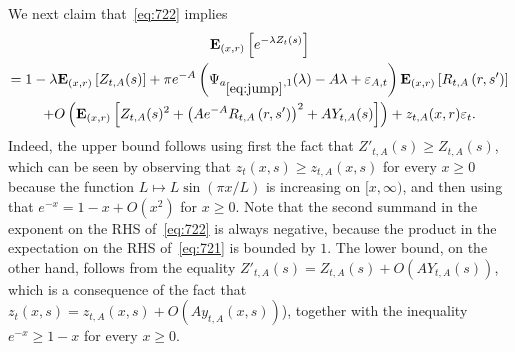 \documentclass[10pt]{amsart}
\theoremstyle{definition}\newtheorem{defi}[theo]{Definition}\newtheorem{rema}[theo]{Remark}\newtheorem{exam}[theo]{Example}\newtheorem{exem}[theo]{Example}\newtheorem{nota}[theo]{Notation}
\newcommand*\eps{\varepsilon}
\newcommand*\E{\mathbf{E}}
\newcommand{\1} {\mathds{1}}
\begin{document}
We next claim that~\eqref{eq:722} implies
\begin{multline}\label{eq:723}
\E_{(x,r)}\left[e^{-\lambda Z_t(s)}\right]\\
= 1-\lambda \E_{(x,r)}\left[Z_{t,A}(s)\right] + \pi e^{-A}\left(\Psi_{a_{\eqref{eq:jump}},1}(\lambda) - A\lambda + \eps_{A,t}\right)\E_{(x,r)}\left[R_{t,A}\left(r,s'\right)\right]\\
+ O\left(\E_{(x,r)}\left[Z_{t,A}(s)^2 + \left(Ae^{-A}R_{t,A}\left(r,s'\right)\right)^2 + AY_{t,A}(s)\right]\right) + z_{t,A}(x,r)\eps_t.
\end{multline}
Indeed, the upper bound follows using first the fact that $Z'_{t,A}(s)\ge Z_{t,A}(s)$, which can be seen by observing that $z_t(x,s) \ge z_{t,A}(x,s)$ for every $x\ge0$ because the function $L \mapsto L \sin(\pi x/L)$ is increasing on $[x, \infty)$, and then using that $e^{-x} = 1-x+O(x^2)$ for $x\ge0$. Note that the second summand in the exponent on the RHS of~\eqref{eq:722} is always negative, because the product in the expectation on the RHS of~\eqref{eq:721} is bounded by $1$. The lower bound, on the other hand, follows from the equality $Z'_{t,A}(s) = Z_{t,A}(s) + O(A Y_{t,A}(s))$, which is a consequence of the fact that $z_t(x,s) = z_{t,A}(x,s) + O(Ay_{t,A}(x,s))$), together with the inequality $e^{-x} \ge 1-x$ for every $x\ge 0$.
\end{document}
